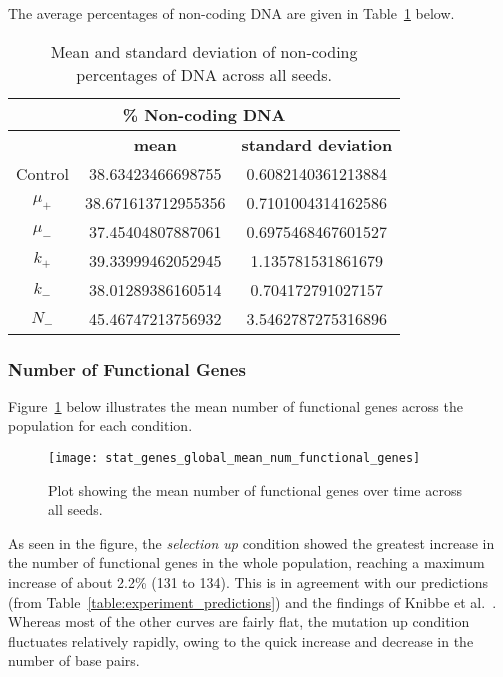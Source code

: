 The average percentages of non-coding DNA are given in Table~\ref{table:non-coding_DNA_mean_and_standard_deviation} below. 
\begin{table}[H]
	\begin{tabular}{|c|c|c|}
		\hline
		\multicolumn{3}{c}{\Large \textbf{\% Non-coding DNA}} \\
		\hline
		& \textbf{mean} & \textbf{standard deviation} \\
		\hline \hline
		Control & 38.63423466698755	& 0.6082140361213884 \\
		\hline
		$\mu_+$ & 38.671613712955356 & 0.7101004314162586 \\
		\hline
		$\mu_-$ & 37.45404807887061 & 0.6975468467601527 \\
		\hline
		$k_+$ & 39.33999462052945 & 1.135781531861679 \\
		\hline
		$k_-$ & 38.01289386160514 & 0.704172791027157 \\
		\hline
		$N_-$ & 45.46747213756932 & 3.5462787275316896 \\
		\hline
	\end{tabular}
	\caption[Non-coding DNA mean and standard deviation]{Mean and standard deviation of non-coding percentages of DNA across all seeds.}
	\label{table:non-coding_DNA_mean_and_standard_deviation}
\end{table}

\subsubsection{Number of Functional Genes}\label{sec:number_of_functional_genes}
Figure~\ref{fig:mean_num_functional_genes} below illustrates the mean number of functional genes across the population for each condition.  
\begin{figure}[H]
	\centering
	\texttt{[image: stat\_genes\_global\_mean\_num\_functional\_genes]}
	\caption[Mean number of functional genes]{Plot showing the mean number of functional genes over time across all seeds.}
	\label{fig:mean_num_functional_genes}
\end{figure}
As seen in the figure, the \textit{selection up} condition showed the greatest increase in the number of functional genes in the whole population, reaching a maximum increase of about 2.2\% (131 to 134). This is in agreement with our predictions (from Table~\ref{table:experiment_predictions}) and the findings of Knibbe et al.~\cite{Knibbe2007}. Whereas most of the other curves are fairly flat, the mutation up condition fluctuates relatively rapidly, owing to the quick increase and decrease in the number of base pairs. 

